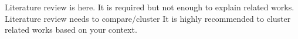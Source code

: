﻿Literature review is here.
It is required but not enough to explain related works.
Literature review needs to compare/cluster 
It is highly recommended to cluster related works based on your context.